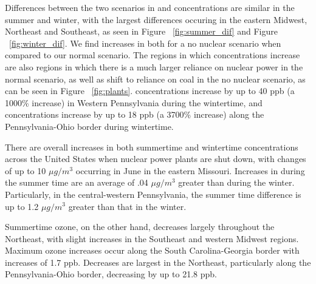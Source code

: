 \documentclass[12]{article}
\begin{document}
Differences between the two scenarios in  and  concentrations are similar in the summer and winter, with the largest differences occuring in the eastern Midwest, Northeast and Southeast, as seen in Figure ~\ref{fig:summer_dif} and Figure ~\ref{fig:winter_dif}. We find increases in both for a no nuclear scenario when compared to our normal scenario. The regions in which concentrations increase are also regions in which there is a much larger reliance on nuclear power in the normal scenario, as well as shift to reliance on coal in the no nuclear scenario, as can be seen in Figure ~\ref{fig:plants}.  concentrations increase by up to 40 ppb (a 1000\% increase) in Western Pennsylvania during the wintertime, and  concentrations increase by up to 18 ppb (a 3700\% increase) along the Pennsylvania-Ohio border during wintertime. 

There are overall increases in both summertime and wintertime  concentrations across the United States when nuclear power plants are shut down, with changes of up to 10 $\mu g/m^3$ occurring in June in the eastern Missouri. Increases in  during the summer time are an average of .04 $\mu g/m^3$ greater than during the winter. Particularly, in the central-western Pennsylvania, the summer time  difference is up to 1.2 $\mu g/m^3$ greater than that in the winter. 

Summertime ozone, on the other hand, decreases largely throughout the Northeast, with slight increases in the Southeast and western Midwest regions. Maximum ozone increases occur along the South Carolina-Georgia border with increases of 1.7 ppb. Decreases are largest in the Northeast, particularly along the Pennsylvania-Ohio border, decreasing by up to 21.8 ppb. 
\end{document}
